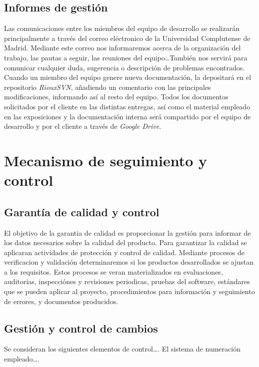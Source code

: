 \documentclass[11pt, a4paper, twoside]{report}
\begin{document}
		\subsection{Informes de gestión}
		Las comunicaciones entre los miembros del equipo de desarrollo se realizarán principalmente a través del correo eléctronico de la Universidad Complutense de Madrid. Mediante este correo nos informaremos acerca de la organización del trabajo, las pautas a seguir, las reuniones del equipo\ldots También nos servirá para comunicar cualquier duda, sugerencia o descripción de problemas encontrados. \\
		Cuando un miembro del equipo genere nueva documentación, la depositará en el repositorio \textit{RiouxSVN}, añadiendo un comentario con las principales modificaciones, informando así al resto del equipo. Todos los documentos solicitados por el cliente en las distintas entregas, así como el material empleado en las exposiciones y la documentación interna será compartido por el equipo de desarrollo y por el cliente a través de  \textit{Google Drive}.
	\section{Mecanismo de seguimiento y control}
		\subsection{Garantía de calidad y control}
		El objetivo de la garantia de calidad es proporcionar la gestión para informar de los datos necesarios sobre la calidad del producto. Para garantizar la calidad se aplicaran actividades de protección y control de calidad. Mediante procesos de verificacion y validación determinaremos si los productos desarrollados se ajustan a los requisitos. Estos procesos se veran materializados en evaluaciones, auditorias, inspecciónes y revisiones periodicas, pruebas del software, estándares que se pueden aplicar al proyecto, procedimientos para información y seguimiento de errores, y documentos producidos.
		\subsection{Gestión y control de cambios}
			Se consideran los siguientes elementos de control\ldots. El sistema de numeración empleado\ldots.
		
\end{document}
